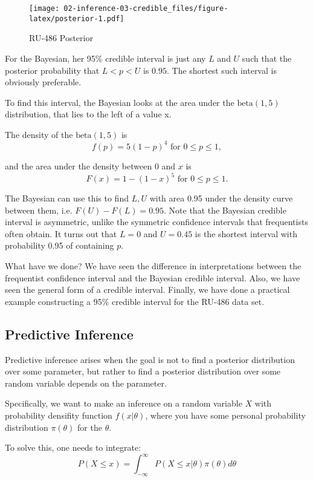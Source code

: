 \documentclass[]{book}
\theoremstyle{definition}
\theoremstyle{definition}
\theoremstyle{remark}
\begin{document}
\begin{figure}
\centering
\texttt{[image: 02-inference-03-credible\_files/figure-latex/posterior-1.pdf]}
\caption{\label{fig:posterior}RU-486 Posterior}
\end{figure}

For the Bayesian, her 95\% credible interval is just any \(L\) and \(U\)
such that the posterior probability that \(L < p < U\) is \(0.95\). The
shortest such interval is obviously preferable.

To find this interval, the Bayesian looks at the area under the
\(\text{beta}(1,5)\) distribution, that lies to the left of a value x.

The density of the \(\text{beta}(1,5)\) is
\[f(p) = 5 (1-p)^4 \text{ for } 0 \leq p \leq 1,\]

and the area under the density between \(0\) and \(x\) is
\[F(x) = 1 - (1-x)^5 \text{ for } 0 \leq p \leq 1.\]

The Bayesian can use this to find \(L, U\) with area 0.95 under the
density curve between them, i.e. \(F(U) − F(L) = 0.95\). Note that the
Bayesian credible interval is asymmetric, unlike the symmetric
confidence intervals that frequentists often obtain. It turns out that
\(L = 0\) and \(U = 0.45\) is the shortest interval with probability
0.95 of containing \(p\).

What have we done? We have seen the difference in interpretations
between the frequentist confidence interval and the Bayesian credible
interval. Also, we have seen the general form of a credible interval.
Finally, we have done a practical example constructing a 95\% credible
interval for the RU-486 data set.

\subsection{Predictive Inference}\label{predictive-inference}

Predictive inference arises when the goal is not to find a posterior
distribution over some parameter, but rather to find a posterior
distribution over some random variable depends on the parameter.

Specifically, we want to make an inference on a random variable \(X\)
with probability densifity function \(f(x|\theta)\), where you have some
personal probability distribution \(\pi(\theta)\) for the \(\theta\).

To solve this, one needs to integrate:
\[P(X \leq x) = \int^{\infty}_{-\infty} P(X \leq x | \theta)\pi(\theta)d\theta\]
\end{document}
